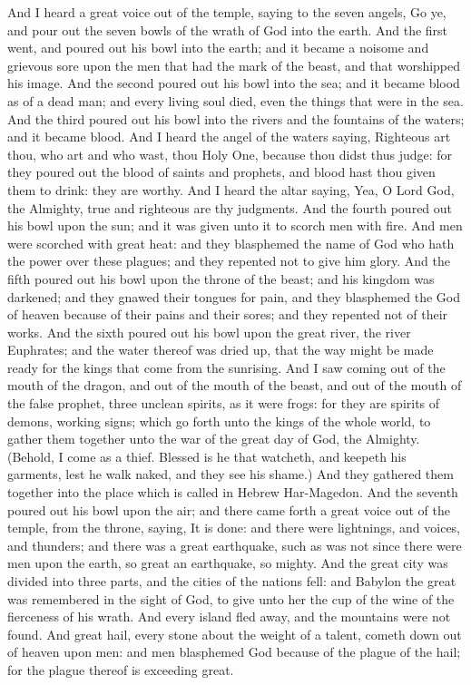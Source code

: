 And I heard a great voice out of the temple, saying to the seven angels, Go ye, and pour out the seven bowls of the wrath of God into the earth.  And the first went, and poured out his bowl into the earth; and it became a noisome and grievous sore upon the men that had the mark of the beast, and that worshipped his image.  And the second poured out his bowl into the sea; and it became blood as of a dead man; and every living soul died, even the things that were in the sea.  And the third poured out his bowl into the rivers and the fountains of the waters; and it became blood. And I heard the angel of the waters saying, Righteous art thou, who art and who wast, thou Holy One, because thou didst thus judge: for they poured out the blood of saints and prophets, and blood hast thou given them to drink: they are worthy. And I heard the altar saying, Yea, O Lord God, the Almighty, true and righteous are thy judgments.  And the fourth poured out his bowl upon the sun; and it was given unto it to scorch men with fire. And men were scorched with great heat: and they blasphemed the name of God who hath the power over these plagues; and they repented not to give him glory.  And the fifth poured out his bowl upon the throne of the beast; and his kingdom was darkened; and they gnawed their tongues for pain, and they blasphemed the God of heaven because of their pains and their sores; and they repented not of their works.  And the sixth poured out his bowl upon the great river, the river Euphrates; and the water thereof was dried up, that the way might be made ready for the kings that come from the sunrising. And I saw coming out of the mouth of the dragon, and out of the mouth of the beast, and out of the mouth of the false prophet, three unclean spirits, as it were frogs: for they are spirits of demons, working signs; which go forth unto the kings of the whole world, to gather them together unto the war of the great day of God, the Almighty. (Behold, I come as a thief. Blessed is he that watcheth, and keepeth his garments, lest he walk naked, and they see his shame.) And they gathered them together into the place which is called in Hebrew Har-Magedon.  And the seventh poured out his bowl upon the air; and there came forth a great voice out of the temple, from the throne, saying, It is done: and there were lightnings, and voices, and thunders; and there was a great earthquake, such as was not since there were men upon the earth, so great an earthquake, so mighty. And the great city was divided into three parts, and the cities of the nations fell: and Babylon the great was remembered in the sight of God, to give unto her the cup of the wine of the fierceness of his wrath. And every island fled away, and the mountains were not found. And great hail, every stone about the weight of a talent, cometh down out of heaven upon men: and men blasphemed God because of the plague of the hail; for the plague thereof is exceeding great. 

